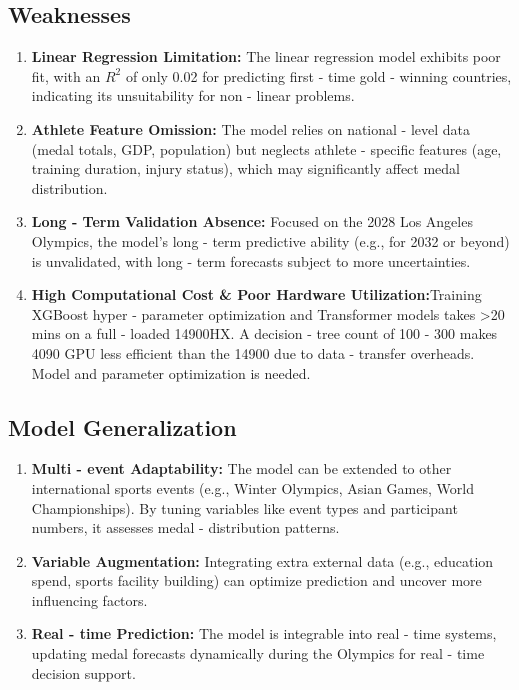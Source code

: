 \documentclass{mcmthesis}
\begin{document}
\subsection{Weaknesses}
\begin{enumerate}
    \item \textbf{Linear Regression Limitation:} The linear regression model exhibits poor fit, with an $R^{2}$ of only 0.02 for predicting first - time gold - winning countries, indicating its unsuitability for non - linear problems.
    \item \textbf{Athlete Feature Omission:} The model relies on national - level data (medal totals, GDP, population) but neglects athlete - specific features (age, training duration, injury status), which may significantly affect medal distribution.
    \item \textbf{Long - Term Validation Absence:} Focused on the 2028 Los Angeles Olympics, the model's long - term predictive ability (e.g., for 2032 or beyond) is unvalidated, with long - term forecasts subject to more uncertainties.
    \item \textbf{High Computational Cost \& Poor Hardware Utilization:}Training XGBoost hyper - parameter optimization and Transformer models takes >20 mins on a full - loaded 14900HX. A decision - tree count of 100 - 300 makes 4090 GPU less efficient than the 14900 due to data - transfer overheads. Model and parameter optimization is needed.
  \end{enumerate}

\subsection{Model Generalization}
\begin{enumerate}
    \item \textbf{Multi - event Adaptability:} The model can be extended to other international sports events (e.g., Winter Olympics, Asian Games, World Championships). By tuning variables like event types and participant numbers, it assesses medal - distribution patterns.
    \item \textbf{Variable Augmentation:} Integrating extra external data (e.g., education spend, sports facility building) can optimize prediction and uncover more influencing factors.
    \item \textbf{Real - time Prediction:} The model is integrable into real - time systems, updating medal forecasts dynamically during the Olympics for real - time decision support.
\end{enumerate}
\end{document}

